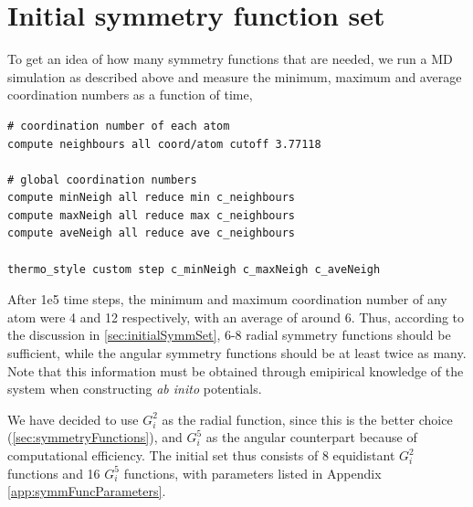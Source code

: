 \documentclass[twoside,english]{uiofysmaster}
\begin{document}
\section{Initial symmetry function set}
To get an idea of how many symmetry functions that are needed, we run a MD simulation as described above and 
measure the minimum, maximum and average coordination numbers as a function of time, 
\begin{lstlisting}[style=lammps]
# coordination number of each atom
compute neighbours all coord/atom cutoff 3.77118

# global coordination numbers
compute minNeigh all reduce min c_neighbours
compute maxNeigh all reduce max c_neighbours
compute aveNeigh all reduce ave c_neighbours

thermo_style custom step c_minNeigh c_maxNeigh c_aveNeigh 
\end{lstlisting}
After 1e5 time steps, the minimum and maximum coordination number of any atom were 4 and 12 respectively, with an average 
of around 6. Thus, according to the discussion in \autoref{sec:initialSymmSet}, 6-8 radial symmetry functions should be sufficient, 
while the angular symmetry functions should be at least twice as many. Note that this information must be obtained through 
emipirical knowledge of the system when constructing \textit{ab inito} potentials. 

We have decided to use $G_i^2$ as the radial function, 
since this is the better choice (\autoref{sec:symmetryFunctions}), and $G_i^5$ as the angular counterpart
because of computational efficiency. The initial set thus consists of 8 equidistant $G_i^2$ functions and 16 $G_i^5$ functions, 
with parameters listed in Appendix \autoref{app:symmFuncParameters}.
\end{document}
